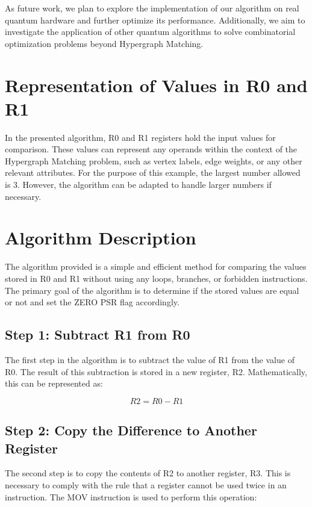 As future work, we plan to explore the implementation of our algorithm on real quantum hardware and further optimize its performance. Additionally, we aim to investigate the application of other quantum algorithms to solve combinatorial optimization problems beyond Hypergraph Matching.



\section{Representation of Values in R0 and R1}

In the presented algorithm, R0 and R1 registers hold the input values for comparison. These values can represent any operands within the context of the Hypergraph Matching problem, such as vertex labels, edge weights, or any other relevant attributes. For the purpose of this example, the largest number allowed is 3. However, the algorithm can be adapted to handle larger numbers if necessary.

\section{Algorithm Description}

The algorithm provided is a simple and efficient method for comparing the values stored in R0 and R1 without using any loops, branches, or forbidden instructions. The primary goal of the algorithm is to determine if the stored values are equal or not and set the ZERO PSR flag accordingly.

\subsection{Step 1: Subtract R1 from R0}

The first step in the algorithm is to subtract the value of R1 from the value of R0. The result of this subtraction is stored in a new register, R2. Mathematically, this can be represented as:

\begin{equation}
    R2 = R0 - R1
\end{equation}

\subsection{Step 2: Copy the Difference to Another Register}

The second step is to copy the contents of R2 to another register, R3. This is necessary to comply with the rule that a register cannot be used twice in an instruction. The MOV instruction is used to perform this operation:

